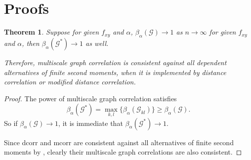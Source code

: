 \documentclass[11pt]{article}
\newcommand{\G}{\mathcal{G}}
\newtheorem{appThm}{Theorem}
\begin{document}
\section{Proofs}
\label{appen:proofs}
\begin{appThm}
Suppose for given $f_{xy}$ and $\alpha$, $\beta_{\alpha}(\G) \rightarrow 1$ as $n \rightarrow \infty$ for given $f_{xy}$ and $\alpha$, then $\beta_{\alpha}(\G^{*}) \rightarrow 1$ as well.

Therefore, multiscale graph correlation is consistent against all dependent alternatives of finite second moments, when it is implemented by distance correlation or modified distance correlation.
\end{appThm}
\begin{proof}
The power of multiscale graph correlation satisfies
\begin{equation}
\beta_{\alpha}(\G^{*})=\max_{k,l}\{\beta_{\alpha}(\G_{kl})\} \geq \beta_{\alpha}(\G).
\end{equation}
So if $\beta_{\alpha}(\G) \rightarrow 1$, it is immediate that $\beta_{\alpha}(\G^{*}) \rightarrow 1$.

Since dcorr and mcorr are consistent against all alternatives of finite second moments by \cite{SzekelyRizzoBakirov2007, SzekelyRizzo2013a}, clearly their multiscale graph correlations are also consistent.
\end{proof}
\end{document}
